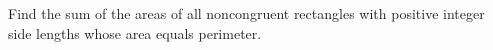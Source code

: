 Find the sum of the areas of all noncongruent rectangles with positive integer side lengths whose area equals perimeter.
